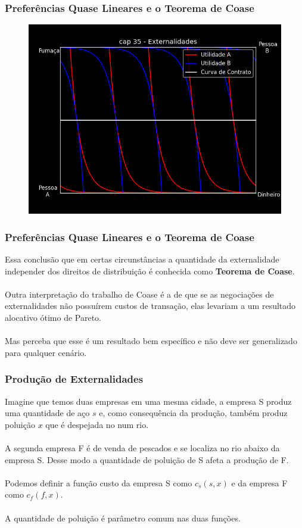 \documentclass{beamer}[10]
\begin{document}
\begin{frame}
	\frametitle{Preferências Quase Lineares e o Teorema de Coase}

	\begin{figure}[H]
		\centering
		\includegraphics[scale=0.6]{cap35_2-teorema_coase.png}
	\end{figure}

\end{frame}

\begin{frame}
	\frametitle{Preferências Quase Lineares e o Teorema de Coase}

	Essa conclusão que em certas circunstâncias a quantidade da externalidade independer dos direitos de distribuição é conhecida como \textbf{Teorema de Coase}.
	\\~\\
	Outra interpretação do trabalho de Coase é a de que se as negociações de externalidades não possuírem custos de transação, elas levariam a um resultado alocativo ótimo de Pareto.
	\\~\\
	Mas perceba que esse é um resultado bem específico e não deve ser generalizado para qualquer cenário.

\end{frame}

\begin{frame}
	\frametitle{Produção de Externalidades}

	Imagine que temos duas empresas em uma mesma cidade, a empresa S produz uma quantidade de aço $s$ e, como consequência da produção, também produz poluição $x$ que é despejada no num rio.
	\\~\\
	A segunda empresa F é de venda de pescados e se localiza no rio abaixo da empresa S. Desse modo a quantidade de poluição de S afeta a produção de F.
	\\~\\
	Podemos definir a função custo da empresa S como $c_s(s,x)$ e da empresa F como $c_f(f,x)$.
	\\~\\
	A quantidade de poluição é parâmetro comum nas duas funções.

\end{frame}
\end{document}
